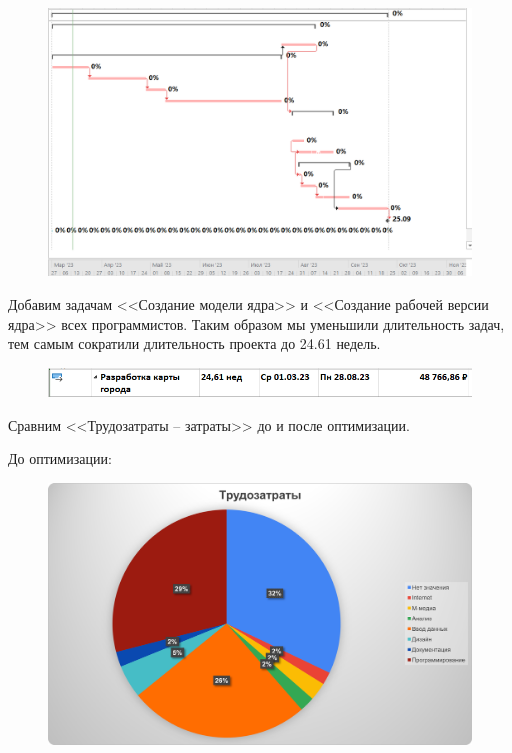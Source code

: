 \begin{figure}[H]
	\begin{center}
		\includegraphics[width=\textwidth]{imgs/task_3_1.png}
	\end{center}
\end{figure}

Добавим задачам <<Создание модели ядра>> и <<Создание рабочей версии ядра>> всех программистов. Таким образом мы уменьшили длительность задач, тем самым сократили длительность проекта до 24.61 недель.

\begin{figure}[H]
	\begin{center}
		\includegraphics[width=\textwidth]{imgs/task_3_2.png}
	\end{center}
\end{figure}

Сравним <<Трудозатраты -- затраты>> до и после оптимизации.

До оптимизации:

\begin{figure}[H]
	\begin{center}
		\includegraphics[width=\textwidth]{imgs/task_3_4.png}
	\end{center}
\end{figure}

